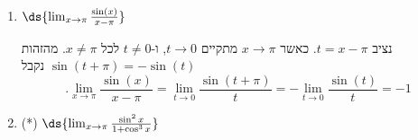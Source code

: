 \begin{enumerate}
\begin{solbox}
נציג עוד פתרון. נזכר בזהות
$$.1-\cos x=2\sin^2(\tfrac{x}{2})$$
נציג
\begin{align*}
    \frac{1-\cos16x}{\tan(5x)\sin(3x)}&=\frac{2\sin^2(8x)}{\tan(5x)\sin(3x)}
    = \frac{2\sin(8x)\sin(8x)\cos(5x)}{\sin(5x)\sin(3x)}\\
    &=\ 2\cdot\frac{\sin(8x)}{\color{red}8x}\cdot\frac{\sin(8x)}{\color{red}8x}\cdot\frac{\color{red}5x}{\sin(5x)}\cdot\frac{\color{red}3x}{\sin(3x)}\cdot\frac{{\color{red}8\cdot8}\cdot\cos(5x)}{\color{red}5\cdot3}\\
    &=\ \frac{128}{15}\cdot\cos(5x)\cdot\frac{\sin(8x)}{8x}\cdot\frac{\sin(8x)}{8x}\cdot\frac{5x}{\sin(5x)}\cdot\frac{3x}{\sin(3x)},
\end{align*}
מכאן
\begin{align*}
    \lim_{x\to0}\frac{1-\cos(16x)}{\tan(5x)\sin(3x)}
    &=\ \lim_{x\to0} \frac{128}{15}\cdot\cos(5x)\cdot\frac{\sin(8x)}{8x}\cdot\frac{\sin(8x)}{8x}\cdot\frac{5x}{\sin(5x)}\cdot\frac{3x}{\sin(3x)}\\
    &= \frac{128}{15}\cdot1\cdot1\cdot1\cdot1\cdot1
    =\frac{128}{15}.
\end{align*}
הערה: בחישוב הגבול השתמשנו באריתמטיקה של גבולות: הגבול של סכום, של מכפלה ושל מנה של פונקציות מתכנסות שווה לסכום, למכפלה ולמנה של הגבולות, כל עוד הגבול של המכנה שונה מ-$0$.
\end{solbox}
\fi
\item $\ds{ \lim_{x \to \pi} \frac{\sin(x)}{x-\pi}}$

\ifsol
{}
\begin{solbox}
נציב
$t=x-\pi$.
כאשר
$x\to\pi$
מתקיים
$t\to0$,
ו-$t\neq0$ לכל $x\neq\pi$.
מהזהות
$\sin(t+\pi)=-\sin(t)$
נקבל
$$.\lim_{x\to\pi}\frac{\sin(x)}{x-\pi}=\lim_{t\to0}\frac{\sin(t+\pi)}{t}=-\lim_{t\to0}\frac{\sin(t)}{t}=-1$$
\end{solbox}
\fi


\item (*) $\ds{ \lim_{x \to {\pi}} \frac{\sin^2 x}{1+ \cos^3 x}}$


\end{enumerate}
